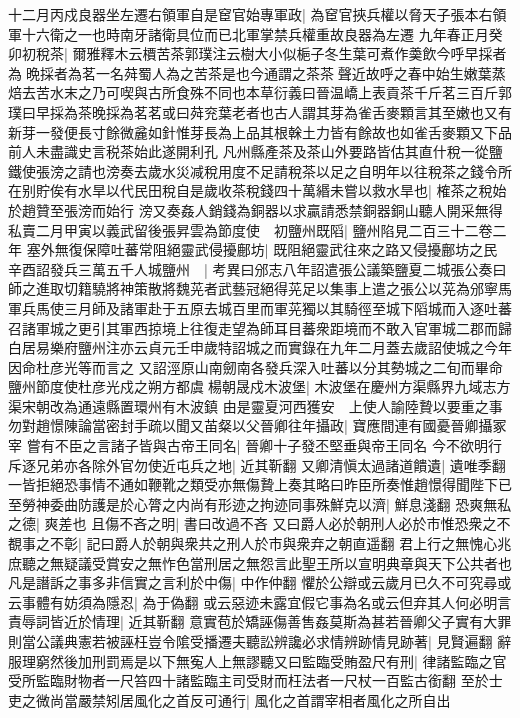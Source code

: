 十二月丙戍良器坐左遷右領軍自是䆠官始專軍政|{
	為䆠官挾兵權以脅天子張本右領軍十六衛之一也時南牙諸衛具位而已北軍掌禁兵權重故良器為左遷}
九年春正月癸卯初稅茶|{
	爾雅釋木云檟苦茶郭璞注云樹大小似梔子冬生葉可煮作羮飲今呼早採者為晩採者為茗一名荈蜀人為之苦茶是也今通謂之茶茶聲近故呼之春中始生嫩葉蒸焙去苦水末之乃可喫與古所食殊不同也本草衍義曰晉温嶠上表貢茶千斤茗三百斤郭璞曰早採為茶晚採為茗茗或曰荈兖葉老者也古人謂其芽為雀舌麥顆言其至嫩也又有新芽一發便長寸餘微麄如針惟芽長為上品其根榦土力皆有餘故也如雀舌麥顆又下品前人未盡識史言税茶始此遂開利孔}
凡州縣產茶及茶山外要路皆估其直什稅一從鹽鐵使張滂之請也滂奏去歲水災减稅用度不足請稅茶以足之自明年以往稅茶之錢令所在别貯俟有水旱以代民田稅自是歲收茶稅錢四十萬緡未嘗以救水旱也|{
	榷茶之稅始於趙贊至張滂而始行}
滂又奏姦人銷錢為銅器以求贏請悉禁銅器銅山聽人開采無得私賣二月甲寅以義武留後張昇雲為節度使　初鹽州既䧟|{
	鹽州陷見二百三十二卷二年}
塞外無復保障吐蕃常阻絕靈武侵擾鄜坊|{
	既阻絕靈武往來之路又侵擾鄜坊之民}
辛酉詔發兵三萬五千人城鹽州　|{
	考異曰邠志八年詔遣張公議築鹽夏二城張公奏曰師之進取切籍驍將神策散將魏茪者武藝冠絕得茪足以集事上遣之張公以茪為邠寧馬軍兵馬使三月師及諸軍赴于五原去城百里而軍茪獨以其騎徑至城下䧟城而入逐吐蕃召諸軍城之更引其軍西掠境上往復走望為師耳目蕃衆距境而不敢入官軍城二郡而歸白居易樂府鹽州注亦云貞元壬申歲特詔城之而實錄在九年二月蓋去歲詔使城之今年因命杜彦光等而言之}
又詔涇原山南劒南各發兵深入吐蕃以分其勢城之二旬而畢命鹽州節度使杜彦光戍之朔方都虞楊朝晟戍木波堡|{
	木波堡在慶州方渠縣界九域志方渠宋朝改為通遠縣置環州有木波鎮}
由是靈夏河西獲安　上使人諭陸贄以要重之事勿對趙憬陳論當密封手疏以聞又苖粲以父晉卿往年攝政|{
	寶應間連有國憂晉卿攝冢宰}
嘗有不臣之言諸子皆與古帝王同名|{
	晉卿十子發丕堅垂與帝王同名}
今不欲明行斥逐兄弟亦各除外官勿使近屯兵之地|{
	近其靳翻}
又卿清愼太過諸道饋遺|{
	遺唯季翻}
一皆拒絕恐事情不通如鞭靴之類受亦無傷贄上奏其略曰昨臣所奏惟趙憬得聞陛下已至勞神委曲防護是於心膂之内尚有形迹之拘迹同事殊鮮克以濟|{
	鮮息淺翻}
恐爽無私之德|{
	爽差也}
且傷不吝之明|{
	書曰改過不吝}
又曰爵人必於朝刑人必於市惟恐衆之不覩事之不彰|{
	記曰爵人於朝與衆共之刑人於市與衆弃之朝直遥翻}
君上行之無愧心兆庶聽之無疑議受賞安之無怍色當刑居之無怨言此聖王所以宣明典章與天下公共者也凡是譖訴之事多非信實之言利於中傷|{
	中作仲翻}
懼於公辯或云歲月已久不可究尋或云事體有妨須為隱忍|{
	為于偽翻}
或云惡迹未露宜假它事為名或云但弃其人何必明言責辱詞皆近於情理|{
	近其靳翻}
意實苞於矯誣傷善售姦莫斯為甚若晉卿父子實有大罪則當公議典憲若被誣枉豈令隂受播遷夫聽訟辨讒必求情辨跡情見跡著|{
	見賢遍翻}
辭服理窮然後加刑罰焉是以下無寃人上無謬聽又曰監臨受賄盈尺有刑|{
	律諸監臨之官受所監臨財物者一尺笞四十諸監臨主司受財而枉法者一尺杖一百監古銜翻}
至於士吏之微尚當嚴禁矧居風化之首反可通行|{
	風化之首謂宰相者風化之所自出}
